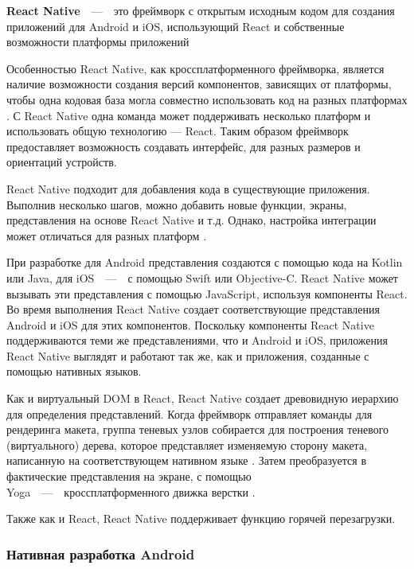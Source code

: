 
\textbf{React Native}~~---~~это фреймворк с открытым исходным кодом для создания приложений для Android и iOS, использующий React и собственные возможности платформы приложений \cite{react-components}

Особенностью React Native, как кроссплатформенного фреймворка, является наличие возможности создания версий компонентов, зависящих от платформы, чтобы одна кодовая база могла совместно использовать код на разных платформах \cite{react-native}. С React Native одна команда может поддерживать несколько платформ и использовать общую технологию — React.
Таким образом фреймворк предоставляет возможность создавать интерфейс, для разных размеров и ориентаций устройств.

React Native подходит для добавления кода в существующие приложения. 
Выполнив несколько шагов, можно добавить новые функции, экраны, представления на основе React Native и т.д.
Однако, настройка интеграции может отличаться для разных платформ \cite{react-native-integr}. 

При разработке для Android представления создаются с помощью кода на Kotlin или Java, для iOS~~---~~с помощью Swift или Objective-C. 
React Native может вызывать эти представления с помощью JavaScript, используя компоненты React. 
Во время выполнения React Native создает соответствующие представления Android и iOS для этих компонентов. 
Поскольку компоненты React Native поддерживаются теми же представлениями, что и Android и iOS, приложения React Native выглядят и работают так же, как и приложения, созданные с помощью нативных языков. 

Как и виртуальный DOM в React, React Native создает древовидную иерархию для определения представлений.
Когда фреймворк отправляет команды для рендеринга макета, группа теневых узлов собирается для построения теневого (виртуального) дерева, которое представляет изменяемую сторону макета, написанную на соответствующем нативном языке \cite{react-native-render}. 
Затем преобразуется в фактические представления на экране, с помощью Yoga~~---~~кроссплатформенного движка верстки \cite{yoga}.

Также как и React, React Native поддерживает функцию горячей перезагрузки.
 
\subsubsection{Нативная разработка Android} 

